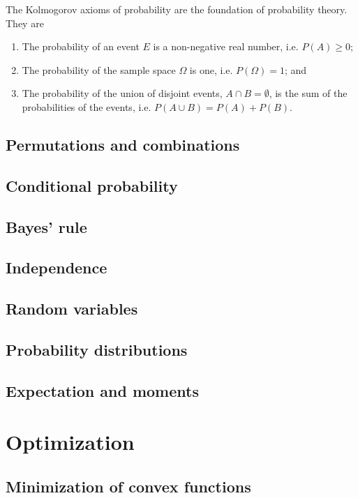 The Kolmogorov axioms of probability are the foundation of probability theory.
They are
\begin{enumerate}
  \item The probability of an event $E$ is a non-negative real number, i.e. $P(A) \geq 0$;
  \item The probability of the sample space $\Omega$ is one, i.e. $P(\Omega) = 1$; and
  \item The probability of the union of disjoint events, $A \cap B = \emptyset$, is
    the sum of the probabilities of the events, i.e. $P(A \cup B) = P(A) + P(B)$.
\end{enumerate}

\subsection{Permutations and combinations}

\subsection{Conditional probability}

\subsection{Bayes' rule}

\subsection{Independence}

\subsection{Random variables}

\subsection{Probability distributions}

\subsection{Expectation and moments}

\section{Optimization}

\subsection{Minimization of convex functions}

